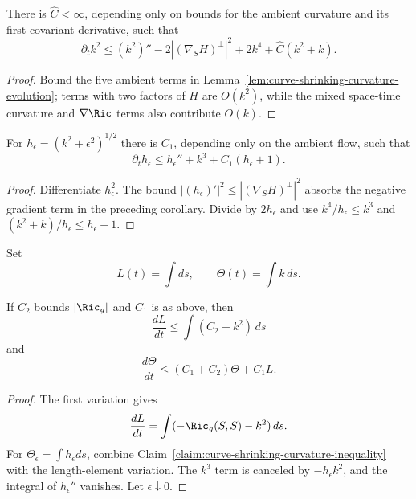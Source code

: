 \begin{corollary}
\label{cor:curve-shrinking-curvature-inequality-bound}
\label{*4'}
There is $\widehat C<\infty$, depending only on bounds for the ambient
curvature and its first covariant derivative, such that
\[
\partial_tk^2\le(k^2)''-2|(\nabla_SH)^\perp|^2+2k^4
+\widehat C(k^2+k).
\]
\end{corollary}
\begin{proof}
\sketch Bound the five ambient terms in
Lemma~\ref{lem:curve-shrinking-curvature-evolution}; terms with two factors of
$H$ are $O(k^2)$, while the mixed space-time curvature and $\nabla\Ric$ terms
also contribute $O(k)$.
\end{proof}

\begin{claim}
\label{claim:curve-shrinking-curvature-inequality}
\label{3rdcurvshr}
For $h_\epsilon=(k^2+\epsilon^2)^{1/2}$ there is $C_1$, depending only on the
ambient flow, such that
\[
\partial_th_\epsilon\le h_\epsilon''+k^3+C_1(h_\epsilon+1).
\]
\end{claim}
\begin{proof}
\sketch Differentiate $h_\epsilon^2$. The bound
$|(h_\epsilon)'|^2\le|(\nabla_SH)^\perp|^2$ absorbs the negative gradient term
in the preceding corollary. Divide by $2h_\epsilon$ and use
$k^4/h_\epsilon\le k^3$ and $(k^2+k)/h_\epsilon\le h_\epsilon+1$.
\end{proof}

Set
\[
L(t)=\int ds,
\qquad
\Theta(t)=\int k\,ds.
\]

\begin{lemma}
\label{lem:curve-shrinking-length-curvature-growth}
\label{1835}
If $C_2$ bounds $|\Ric_g|$ and $C_1$ is as above, then
\begin{equation}\label{Lformula}
\frac{dL}{dt}\le\int(C_2-k^2)\,ds
\end{equation}
and
\[
\frac{d\Theta}{dt}\le(C_1+C_2)\Theta+C_1L.
\]
\end{lemma}
\begin{proof}
\sketch The first variation gives
\begin{equation}\label{dLdteqn}
\frac{dL}{dt}=\int(-\Ric_g(S,S)-k^2)\,ds.
\end{equation}
For $\Theta_\epsilon=\int h_\epsilon ds$, combine
Claim~\ref{claim:curve-shrinking-curvature-inequality} with the length-element
variation. The $k^3$ term is canceled by $-h_\epsilon k^2$, and the integral
of $h_\epsilon''$ vanishes. Let $\epsilon\downarrow0$.
\end{proof}

